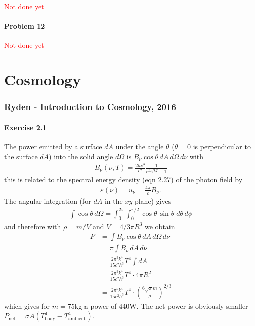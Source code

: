 \documentclass[10pt,a4paper]{book}
\theoremstyle{definition}
\begin{document}
\textcolor{red}{Not done yet}
\subsubsection{Problem 12}
\textcolor{red}{Not done yet}

\chapter{Cosmology}
\subsection{{\sc Ryden} - Introduction to Cosmology, 2016}
\subsubsection{Exercise 2.1}
The power emitted by a surface $dA$ under the angle $\theta$ ($\theta=0$ is perpendicular to the surface $dA$) into the solid angle $d\Omega$ is $B_\nu\cos\theta\,dA\,d\Omega\,d\nu$ with
\begin{align}
B_\nu(\nu,T)=\frac{2h\nu^3}{c^2}\frac{1}{e^{h\nu/kT}-1}
\end{align}
this is related to the spectral energy density (eqn 2.27) of the photon field by
\begin{align}
\varepsilon(\nu)=u_\nu=\frac{4\pi}{c}B_\nu.
\end{align}
The angular integration (for $dA$ in the $xy$ plane) gives
\begin{align}
\int\cos\theta\,d\Omega=\int_0^{2\pi}\int_0^{\pi/2}\cos\theta\,\sin\theta\;d\theta\,d\phi
\end{align}
and therefore with $\rho=m/V$ and $V=4/3\pi R^3$ we obtain
\begin{align}
P&=\int B_\nu\cos\theta\,dA\,d\Omega\,d\nu\\
&=\pi\int B_\nu\,dA\,d\nu\\
&=\frac{2\pi^5k^4}{15c^2h^3}T^4\int dA\\
&=\frac{2\pi^5k^4}{15c^2h^3}T^4\cdot 4\pi R^2\\
&=\frac{2\pi^5k^4}{15c^2h^3}T^4\cdot \left(\frac{6\sqrt{\pi}m}{\rho}\right)^{2/3}
\end{align}
which gives for $m=75$kg a power of 440W. The net power is obviously smaller $P_\text{net}=\sigma A(T_\text{body}^4-T_\text{ambient}^4)$. 
\end{document}
